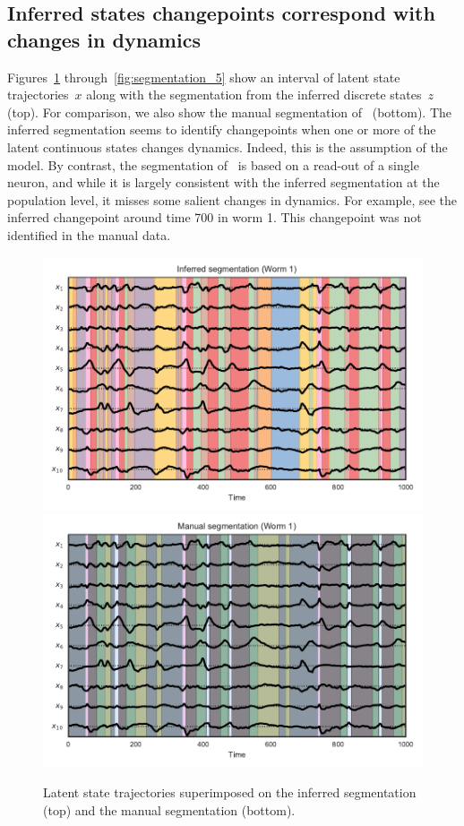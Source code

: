 \documentclass{article}
\begin{document}
\clearpage

\subsection{Inferred states changepoints correspond with changes in dynamics}

Figures~\ref{fig:segmentation_1} through~\ref{fig:segmentation_5} show an
interval of latent state trajectories~$x$ along with the segmentation from
the inferred discrete states~$z$ (top).  For comparison, we also show the
manual segmentation of~\citep{kato2015global} (bottom).  The inferred
segmentation seems to identify changepoints when one or more of the latent
continuous states changes dynamics.  Indeed, this is the assumption of the
model.  By contrast, the segmentation of~\citep{kato2015global} is based on
a read-out of a single neuron, and while it is largely consistent with the
inferred segmentation at the population level, it misses some salient
changes in dynamics.  For example, see the inferred changepoint around
time 700 in worm 1.  This changepoint was not identified in the manual
data.

\begin{figure}[h]
\centering%
\includegraphics[width=5.5in]{figures/arhmm/x_segmentation_0.pdf}
\includegraphics[width=5.5in]{figures/arhmm/x_segmentation_zimmer_0.pdf}
\caption{Latent state trajectories superimposed on the inferred segmentation (top)
  and the manual segmentation (bottom).}
\label{fig:segmentation_1}
\end{figure}
\end{document}
